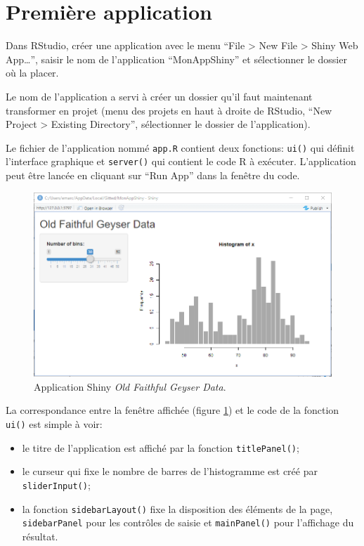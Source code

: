 \documentclass[
  12pt,
  french,
  a4paper,
  extrafontsizes,onecolumn,openright
  ]{memoir}
\providecommand{\tightlist}{%
  \setlength{\itemsep}{0pt}\setlength{\parskip}{0pt}}
\newlength{\rf}
\begin{document}
\section{Première application}\label{premiuxe8re-application}

Dans RStudio, créer une application avec le menu \enquote{File \textgreater{} New File \textgreater{} Shiny Web App\ldots{}}, saisir le nom de l'application \enquote{MonAppShiny} et sélectionner le dossier où la placer.

Le nom de l'application a servi à créer un dossier qu'il faut maintenant transformer en projet (menu des projets en haut à droite de RStudio, \enquote{New Project \textgreater{} Existing Directory}, sélectionner le dossier de l'application).

Le fichier de l'application nommé \texttt{app.R} contient deux fonctions: \texttt{ui()} qui définit l'interface graphique et \texttt{server()} qui contient le code R à exécuter.
L'application peut être lancée en cliquant sur \enquote{Run App} dans la fenêtre du code.



\scriptsize

\begin{figure}

{\centering \includegraphics[width=0.8\linewidth]{images/shiny-geiser} 

}

\caption{Application Shiny \emph{Old Faithful Geyser Data}.}\label{fig:shiny-geiser}
\end{figure}

\normalsize

La correspondance entre la fenêtre affichée (figure \ref{fig:shiny-geiser}) et le code de la fonction \texttt{ui()} est simple à voir:

\begin{itemize}
\tightlist
\item
  le titre de l'application est affiché par la fonction \texttt{titlePanel()};
\item
  le curseur qui fixe le nombre de barres de l'histogramme est créé par \texttt{sliderInput()};
\item
  la fonction \texttt{sidebarLayout()} fixe la disposition des éléments de la page, \texttt{sidebarPanel} pour les contrôles de saisie et \texttt{mainPanel()} pour l'affichage du résultat.
\end{itemize}
\end{document}
